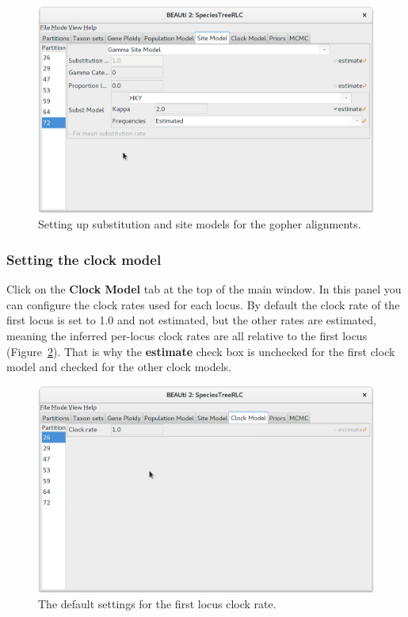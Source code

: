 \documentclass{article}
\begin{document}
\begin{figure}[htb!]
\centering
\includegraphics[width=\textwidth]{figures/beauti-subst.png}
\caption{Setting up substitution and site models for the gopher alignments.}
\label{fig:HKY}
\end{figure}

\subsubsection*{Setting the clock model}

Click on the \textbf{Clock Model} tab at the top of the main window. In
this panel you can configure the clock rates used for each locus. By default the
clock rate of the first locus is set to 1.0 and not estimated, but the other
rates are estimated, meaning the inferred per-locus clock rates are all
relative to the first locus (Figure~\ref{fig:clock}). That is why the
\textbf{estimate} check box is unchecked for the first clock model and checked
for the other clock models.

\begin{figure}[htb!]
\centering
\includegraphics[width=\textwidth]{figures/beauti-clock.png}
\caption{The default settings for the first locus clock rate.}
\label{fig:clock}
\end{figure}
\end{document}
